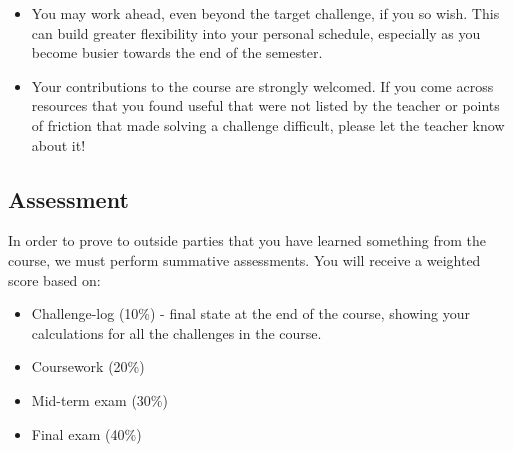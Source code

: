 \begin{itemize}
    \item You may work ahead, even beyond the target challenge, if you so wish. This can build greater flexibility into your personal schedule, especially as you become busier towards the end of the semester.
    \item Your contributions to the course are strongly welcomed. If you come across resources that you found useful that were not listed by the teacher or points of friction that made solving a challenge difficult, please let the teacher know about it!
\end{itemize}

\subsection{Assessment}
In order to prove to outside parties that you have learned something from the course, we must perform summative assessments. You will receive a weighted score based on:

\begin{itemize}
    \item Challenge-log (10\%) - final state at the end of the course, showing your calculations for all the challenges in the course.
    \item Coursework (20\%)
    \item Mid-term exam (30\%)
    \item Final exam (40\%)
\end{itemize}

